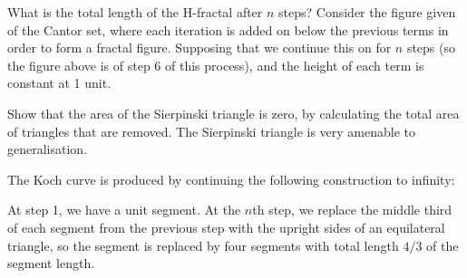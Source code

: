 \begin{questions}
  \question What is the total length of the H-fractal after $ n $ steps?
  \question Consider the figure given of the Cantor set, where each iteration is added on below the previous terms in order
            to form a fractal figure. Supposing that we continue this on for $ n $ steps (so the figure above is of step 6
            of this process), and the height of each term is constant at 1 unit.
  \question Show that the area of the Sierpinski triangle is zero, by calculating the total area of triangles that are removed.
  \question The Sierpinski triangle is very amenable to generalisation.
  \question The Koch curve is produced by continuing the following construction to infinity:
            \begin{con}
              At step 1, we have a unit segment. At the $ n$th step, we replace the middle third of each segment from the previous
              step with the upright sides of an equilateral triangle, so the segment is replaced by four segments with total
              length $ 4/3 $ of the segment length.
            \end{con}
    \begin{parts}

\end{parts}
\end{questions}
